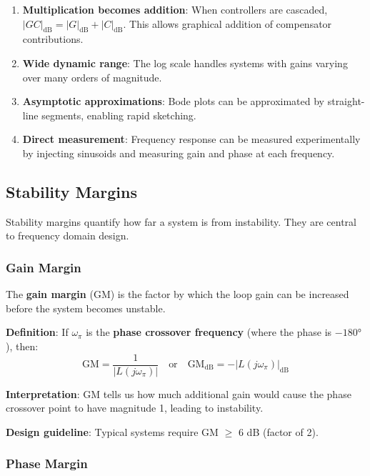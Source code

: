 \begin{enumerate}
    \item \textbf{Multiplication becomes addition}: When controllers are cascaded, $|GC|_{\text{dB}} = |G|_{\text{dB}} + |C|_{\text{dB}}$. This allows graphical addition of compensator contributions.

    \item \textbf{Wide dynamic range}: The log scale handles systems with gains varying over many orders of magnitude.

    \item \textbf{Asymptotic approximations}: Bode plots can be approximated by straight-line segments, enabling rapid sketching.

    \item \textbf{Direct measurement}: Frequency response can be measured experimentally by injecting sinusoids and measuring gain and phase at each frequency.
\end{enumerate}

\subsection{Stability Margins}
\label{subsec:stability_margins}

Stability margins quantify how far a system is from instability. They are central to frequency domain design.

\subsubsection{Gain Margin}

The \textbf{gain margin} (GM) is the factor by which the loop gain can be increased before the system becomes unstable.

\textbf{Definition}: If $\omega_{\pi}$ is the \textbf{phase crossover frequency} (where the phase is $-180°$), then:
\begin{equation}
\text{GM} = \frac{1}{|L(j\omega_{\pi})|} \quad \text{or} \quad \text{GM}_{\text{dB}} = -|L(j\omega_{\pi})|_{\text{dB}}
\end{equation}

\textbf{Interpretation}: GM tells us how much additional gain would cause the phase crossover point to have magnitude 1, leading to instability.

\textbf{Design guideline}: Typical systems require GM $\geq$ 6 dB (factor of 2).

\subsubsection{Phase Margin}

